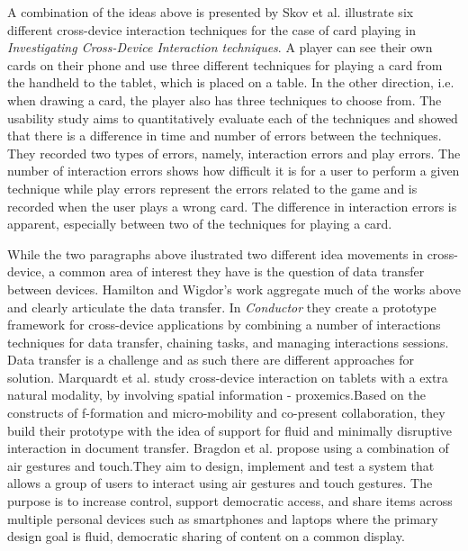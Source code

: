 A combination of the ideas above is presented by Skov et al. \cite{Skov:2015} illustrate six different cross-device interaction techniques for the case of card playing in \emph{Investigating Cross-Device Interaction techniques}.
A player can see their own cards on their phone and use three different techniques for playing a card from the handheld to the tablet, which is placed on a table.
In the other direction, i.e. when drawing a card, the player also has three techniques to choose from.
The usability study aims to quantitatively evaluate each of the techniques and showed that there is a difference in time and number of errors between the techniques. 
They recorded two types of errors, namely, interaction errors and play errors.
The number of interaction errors shows how difficult it is for a user to perform a given technique while play errors represent the errors related to the game and is recorded when the user plays a wrong card.
The difference in interaction errors is apparent, especially between two of the techniques for playing a card.

While the two paragraphs above ilustrated two different idea movements in cross-device, a common area of interest they have is the question of data transfer between devices.
Hamilton and Wigdor's  work \cite{Hamilton:2014} aggregate much of the works above and clearly articulate the data transfer. In \emph{Conductor} they create a prototype framework for cross-device applications by combining a number of interactions techniques for data transfer, chaining tasks, and managing interactions sessions.
Data transfer is a challenge and as such there are different approaches for solution. Marquardt et al. \cite{Marquardt:2012} study cross-device interaction on tablets with a extra natural modality, by involving spatial information - proxemics.Based on the constructs of f-formation and micro-mobility and co-present collaboration, they build their prototype with the idea of support for fluid and minimally disruptive interaction in document transfer. 
Bragdon et al.\cite{Bragdon:2011} propose using a combination of air gestures and touch.They aim to design, implement and test a system that allows a group of users to interact using air gestures and touch gestures. The purpose is to increase control, support democratic access, and share items across multiple personal devices such as smartphones and laptops where the primary design goal is fluid, democratic sharing of content on a common display.

